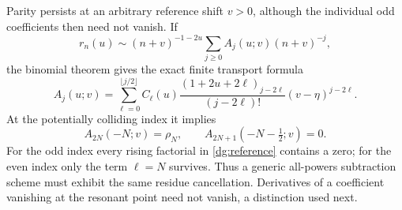 Parity persists at an arbitrary reference shift $v>0$, although the
individual odd coefficients then need not vanish. If
\[
 r_n(u)\sim(n+v)^{-1-2u}\sum_{j\ge0}A_j(u;v)(n+v)^{-j},
\]
the binomial theorem gives the exact finite transport formula
\begin{equation}\label{dg:reference}
 A_j(u;v)=\sum_{\ell=0}^{\lfloor j/2\rfloor}
 C_\ell(u)\frac{(1+2u+2\ell)_{j-2\ell}}{(j-2\ell)!}
                       (v-\eta)^{j-2\ell}.
\end{equation}
At the potentially colliding index it implies
\begin{equation}\label{dg:parityresidue}
 A_{2N}(-N;v)=\rho_N,\qquad
 A_{2N+1}(-N-\tfrac12;v)=0.
\end{equation}
For the odd index every rising factorial in \eqref{dg:reference}
contains a zero; for the even index only the term $\ell=N$ survives.
Thus a generic all-powers subtraction scheme must exhibit the same
residue cancellation. Derivatives of a coefficient vanishing at the
resonant point need not vanish, a distinction used next.
